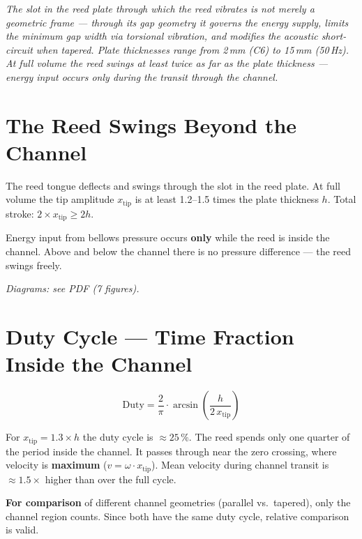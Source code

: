\documentclass[11pt,a4paper]{article}
\begin{document}
\hbmaketitle

{\small\itshape The slot in the reed plate through which the reed vibrates is not merely a geometric frame --- through its gap geometry it governs the energy supply, limits the minimum gap width via torsional vibration, and modifies the acoustic short-circuit when tapered. Plate thicknesses range from 2\,mm (C6) to 15\,mm (50\,Hz). At full volume the reed swings at least twice as far as the plate thickness --- energy input occurs only during the transit through the channel.}

\vspace{4mm}

\section{The Reed Swings Beyond the Channel}

The reed tongue deflects and swings through the slot in the reed plate. At full volume the tip amplitude $x_\text{tip}$ is at least 1.2--1.5 times the plate thickness $h$. Total stroke: $2 \times x_\text{tip} \geq 2h$.

Energy input from bellows pressure occurs \textbf{only} while the reed is inside the channel. Above and below the channel there is no pressure difference --- the reed swings freely.

\textit{Diagrams: see PDF (7 figures).}

\section{Duty Cycle --- Time Fraction Inside the Channel}

\begin{equation}
\text{Duty} = \frac{2}{\pi} \cdot \arcsin\!\left(\frac{h}{2\,x_\text{tip}}\right)
\end{equation}

For $x_\text{tip} = 1{.}3 \times h$ the duty cycle is $\approx 25\,\%$. The reed spends only one quarter of the period inside the channel. It passes through near the zero crossing, where velocity is \textbf{maximum} ($v = \omega \cdot x_\text{tip}$). Mean velocity during channel transit is $\approx 1{.}5\times$ higher than over the full cycle.

\begin{keybox}
\textbf{For comparison} of different channel geometries (parallel vs.\ tapered), only the channel region counts. Since both have the same duty cycle, relative comparison is valid.
\end{keybox}
\end{document}
